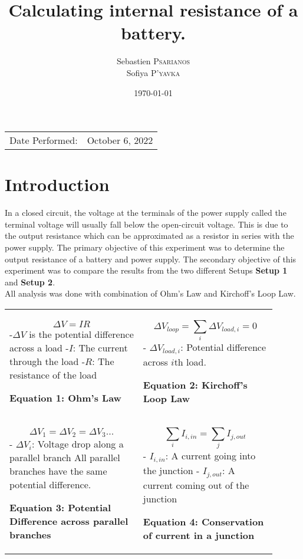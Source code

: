 \documentclass[
	letterpaper, %
	10pt, %
]{CSUniSchoolLabReport}
\title{Calculating internal resistance of a battery.}
\author{Sebastien \textsc{Psarianos}\\ Sofiya \textsc{P'yavka}}
\date{\today}
\begin{document}
\maketitle

\begin{center}
	\begin{tabular}{l r}
		Date Performed: & October 6, 2022 \\
	\end{tabular}
\end{center}
\section{Introduction}
In a closed circuit, the voltage at the terminals of the power supply called the terminal voltage will usually fall below the open-circuit voltage.
This is due to the output resistance which can be approximated as a resistor in series with the power supply. The primary objective of this experiment was to determine the output resistance of a battery and power supply. The secondary objective of this experiment was to compare the results from the two
different Setups \textbf{Setup 1} and \textbf{Setup 2}. \\

All analysis was done with combination of Ohm's Law and Kirchoff's Loop Law.\\

\begin{tabular}{p{0.45\linewidth} p{0.45\linewidth}}
    $$\Delta V = IR$$
    -$\Delta V$ is the potential difference across a load\newline
    -$I$: The current through the load\newline
    -$R$: The resistance of the load
    \begin{center}
        \textbf{Equation 1: Ohm's Law}
    \end{center}
    &
    $$\Delta V_{loop} = \sum_i \Delta V_{load, i} = 0$$
    - $\Delta V_{load,i}$: Potential difference across $i$th load.
    \begin{center}
        \textbf{Equation 2: Kirchoff's Loop Law}
    \end{center}\\
    $$\Delta V_1 = \Delta V_2 = \Delta V_3 ...$$
    - $\Delta V_{i}$: Voltage drop along a parallel branch\newline
    All parallel branches have the same potential\newline
    difference.
    \begin{center}
        \textbf{Equation 3: Potential Difference across parallel branches}
    \end{center}
    &
    $$\sum_i I_{i, in} = \sum_j I_{j,out}$$
    - $I_{i, in}$: A current going into the junction\newline
    - $I_{j,out}$: A current coming out of the junction
    \begin{center}
        \textbf{Equation 4: Conservation of current in a junction}
    \end{center}

\end{tabular}
\end{document}
